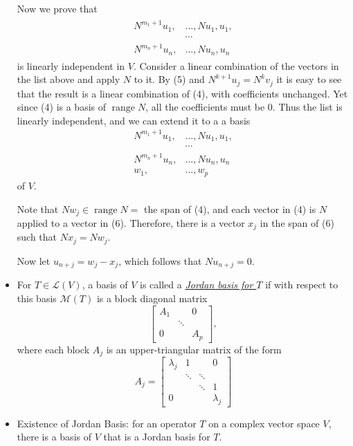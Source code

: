 \documentclass[11pt]{article}
\newcommand{\df}[1]{\ul{\textit{\textsf{#1}}}}
\renewcommand{\r}{\operatorname{range}}
\newcommand{\LV}{\mathcal{L}(V)}
\newcommand{\M}{\mathcal{M}}
\begin{document}
\begin{itemize}
    Now we prove that \begin{align}
    \begin{split}
        N^{m_1+1}u_1,&\dots,Nu_1,u_1, \\ &\cdots \\ N^{m_n+1}u_n,&\dots,Nu_n,u_n
    \end{split} \end{align} is linearly independent in $V$. Consider a linear combination of the vectors in the list above and apply $N$ to it. By (5) and $N^{k+1}u_j = N^k v_j$ it is easy to see that the result is a linear combination of (4), with coefficients unchanged. Yet since (4) is a basis of $\r N$, all the coefficients must be 0. Thus the list is linearly independent, and we can extend it to a a basis \begin{align*}
        N^{m_1+1}u_1,&\dots,Nu_1,u_1, \\ &\cdots \\ N^{m_n+1}u_n,&\dots,Nu_n,u_n \\ w_1,&\dots,w_p
    \end{align*} of $V$.

    Note that $Nw_j \in \r N =$ the span of (4), and each vector in (4) is $N$ applied to a vector in (6). Therefore, there is a vector $x_j$ in the span of (6) such that $Nx_j = Nw_j$.

    Now let $u_{n+j} = w_j - x_j$, which follows that $Nu_{n+j} = 0$. 
    
    
    \item For $T \in \LV$, a basis of $V$ is called a \df{Jordan basis for $T$} if with respect to this basis $\M(T)$ is a block diagonal matrix \[\begin{bmatrix}
        A_1 & & 0 \\ & \ddots & \\ 0 & & A_p
    \end{bmatrix},\] where each block $A_j$ is an upper-triangular matrix of the form \[A_j = \begin{bmatrix}
        \lambda_j & 1 & & 0 \\
        & \ddots & \ddots & \\
        & & \ddots & 1 \\
        0 & & & \lambda_j
    \end{bmatrix}\]
    \item Existence of Jordan Basis: for an operator $T$ on a complex vector space $V$, there is a basis of $V$ that is a Jordan basis for $T$.
\end{itemize}
\end{document}
